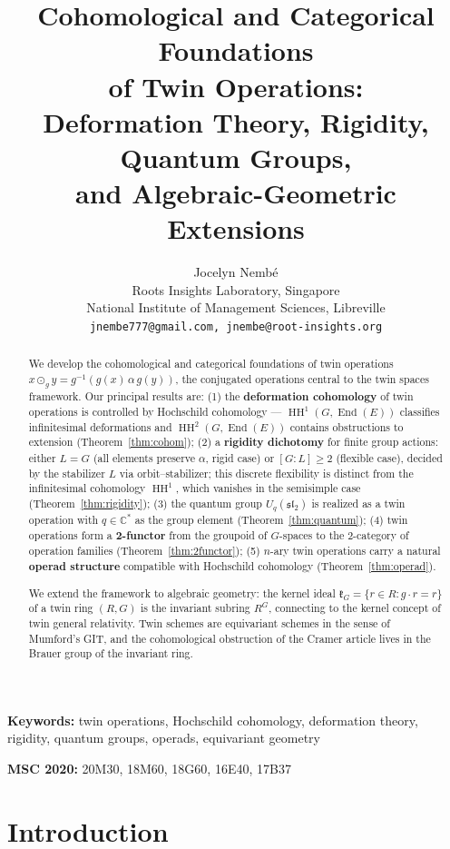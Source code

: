 \documentclass[11pt,twocolumn]{article}
\title{\textbf{Cohomological and Categorical Foundations\\of Twin Operations:\\Deformation Theory, Rigidity, Quantum Groups,\\and Algebraic-Geometric Extensions}}
\author{Jocelyn Nemb\'e\\
\small Roots Insights Laboratory, Singapore\\
\small National Institute of Management Sciences, Libreville\\
\small \texttt{jnembe777@gmail.com, jnembe@root-insights.org}}
\date{}
\theoremstyle{plain}\newtheorem{theorem}{Theorem}\newtheorem{proposition}[theorem]{Proposition}\newtheorem{corollary}[theorem]{Corollary}\newtheorem{lemma}[theorem]{Lemma}
\theoremstyle{definition}\newtheorem{definition}[theorem]{Definition}\newtheorem{example}[theorem]{Example}
\theoremstyle{remark}\newtheorem{remark}[theorem]{Remark}
\newcommand{\HH}{\operatorname{HH}}
\newcommand{\End}{\operatorname{End}}
\begin{document}
\maketitle

\begin{abstract}
We develop the cohomological and categorical foundations of twin operations $x \odot_g y = g^{-1}(g(x) \,\alpha\, g(y))$, the conjugated operations central to the twin spaces framework. Our principal results are:
(1) the \textbf{deformation cohomology} of twin operations is controlled by Hochschild cohomology --- $\HH^1(G, \End(E))$ classifies infinitesimal deformations and $\HH^2(G, \End(E))$ contains obstructions to extension (Theorem~\ref{thm:cohom});
(2) a \textbf{rigidity dichotomy} for finite group actions: either $L = G$ (all elements preserve $\alpha$, rigid case) or $[G:L] \geq 2$ (flexible case), decided by the stabilizer $L$ via orbit--stabilizer; this discrete flexibility is distinct from the infinitesimal cohomology $\HH^1$, which vanishes in the semisimple case (Theorem~\ref{thm:rigidity});
(3) the quantum group $U_q(\mathfrak{sl}_2)$ is realized as a twin operation with $q \in \mathbb{C}^*$ as the group element (Theorem~\ref{thm:quantum});
(4) twin operations form a \textbf{2-functor} from the groupoid of $G$-spaces to the 2-category of operation families (Theorem~\ref{thm:2functor});
(5) $n$-ary twin operations carry a natural \textbf{operad structure} compatible with Hochschild cohomology (Theorem~\ref{thm:operad}).

We extend the framework to algebraic geometry: the kernel ideal $\mathfrak{k}_G = \{r \in R : g \cdot r = r\}$ of a twin ring $(R, G)$ is the invariant subring $R^G$, connecting to the kernel concept of twin general relativity. Twin schemes are equivariant schemes in the sense of Mumford's GIT, and the cohomological obstruction of the Cramer article lives in the Brauer group of the invariant ring.
\end{abstract}

\noindent\textbf{Keywords:} twin operations, Hochschild cohomology, deformation theory, rigidity, quantum groups, operads, equivariant geometry

\noindent\textbf{MSC 2020:} 20M30, 18M60, 18G60, 16E40, 17B37


\section{Introduction}
\end{document}
